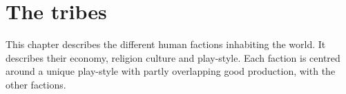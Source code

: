 \chapter{The tribes}
This chapter describes the different human factions inhabiting the world. It
describes their economy, religion culture and play-style. Each faction is
centred around a unique play-style with partly overlapping good production,
with the other factions.














